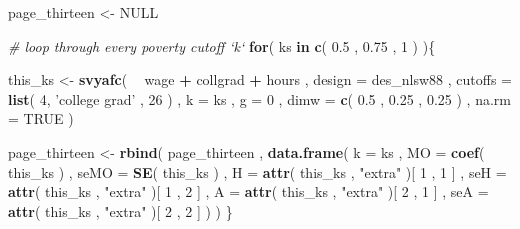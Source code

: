 \documentclass[]{book}
\newenvironment{Shaded}{\begin{snugshade}}{\end{snugshade}}
\newcommand{\CommentTok}[1]{\textcolor[rgb]{0.56,0.35,0.01}{\textit{#1}}}
\newcommand{\ControlFlowTok}[1]{\textcolor[rgb]{0.13,0.29,0.53}{\textbf{#1}}}
\newcommand{\DataTypeTok}[1]{\textcolor[rgb]{0.13,0.29,0.53}{#1}}
\newcommand{\DecValTok}[1]{\textcolor[rgb]{0.00,0.00,0.81}{#1}}
\newcommand{\FloatTok}[1]{\textcolor[rgb]{0.00,0.00,0.81}{#1}}
\newcommand{\KeywordTok}[1]{\textcolor[rgb]{0.13,0.29,0.53}{\textbf{#1}}}
\newcommand{\NormalTok}[1]{#1}
\newcommand{\OperatorTok}[1]{\textcolor[rgb]{0.81,0.36,0.00}{\textbf{#1}}}
\newcommand{\OtherTok}[1]{\textcolor[rgb]{0.56,0.35,0.01}{#1}}
\newcommand{\StringTok}[1]{\textcolor[rgb]{0.31,0.60,0.02}{#1}}
\begin{document}
\begin{Shaded}
\begin{Highlighting}[]
\NormalTok{page_thirteen <-}\StringTok{ }\OtherTok{NULL}

\CommentTok{# loop through every poverty cutoff `k`}
\ControlFlowTok{for}\NormalTok{( ks }\ControlFlowTok{in} \KeywordTok{c}\NormalTok{( }\FloatTok{0.5}\NormalTok{ , }\FloatTok{0.75}\NormalTok{ , }\DecValTok{1}\NormalTok{ ) )\{}
    
\NormalTok{    this_ks <-}
\StringTok{        }\KeywordTok{svyafc}\NormalTok{(}
        \OperatorTok{~}\StringTok{ }\NormalTok{wage }\OperatorTok{+}\StringTok{ }\NormalTok{collgrad }\OperatorTok{+}\StringTok{ }\NormalTok{hours , }
        \DataTypeTok{design =}\NormalTok{ des_nlsw88 , }
        \DataTypeTok{cutoffs =} \KeywordTok{list}\NormalTok{( }\DecValTok{4}\NormalTok{, }\StringTok{'college grad'}\NormalTok{ , }\DecValTok{26}\NormalTok{ ) , }
        \DataTypeTok{k =}\NormalTok{ ks , }
        \DataTypeTok{g =} \DecValTok{0}\NormalTok{ , }
        \DataTypeTok{dimw =} \KeywordTok{c}\NormalTok{( }\FloatTok{0.5}\NormalTok{ , }\FloatTok{0.25}\NormalTok{ , }\FloatTok{0.25}\NormalTok{ ) ,}
        \DataTypeTok{na.rm =} \OtherTok{TRUE}
\NormalTok{      )}
    
\NormalTok{    page_thirteen <-}
\StringTok{        }\KeywordTok{rbind}\NormalTok{(}
\NormalTok{            page_thirteen ,}
            \KeywordTok{data.frame}\NormalTok{( }
                \DataTypeTok{k =}\NormalTok{ ks , }
                \DataTypeTok{MO =} \KeywordTok{coef}\NormalTok{( this_ks ) ,}
                \DataTypeTok{seMO =} \KeywordTok{SE}\NormalTok{( this_ks ) ,}
                \DataTypeTok{H =} \KeywordTok{attr}\NormalTok{( this_ks , }\StringTok{"extra"}\NormalTok{ )[ }\DecValTok{1}\NormalTok{ , }\DecValTok{1}\NormalTok{ ] ,}
                \DataTypeTok{seH =} \KeywordTok{attr}\NormalTok{( this_ks , }\StringTok{"extra"}\NormalTok{ )[ }\DecValTok{1}\NormalTok{ , }\DecValTok{2}\NormalTok{ ] ,}
                \DataTypeTok{A =} \KeywordTok{attr}\NormalTok{( this_ks , }\StringTok{"extra"}\NormalTok{ )[ }\DecValTok{2}\NormalTok{ , }\DecValTok{1}\NormalTok{ ] ,}
                \DataTypeTok{seA =} \KeywordTok{attr}\NormalTok{( this_ks , }\StringTok{"extra"}\NormalTok{ )[ }\DecValTok{2}\NormalTok{ , }\DecValTok{2}\NormalTok{ ]}
\NormalTok{          )}
\NormalTok{        )}
\NormalTok{\}}
\end{Highlighting}
\end{Shaded}
\end{document}
